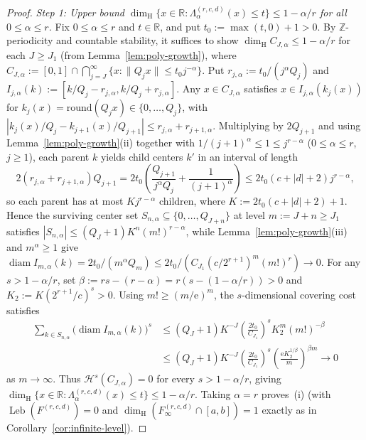 \documentclass[11pt]{article}
\theoremstyle{definition}
\theoremstyle{remark}
\newcommand{\R}{\mathbb{R}}
\newcommand{\Z}{\mathbb{Z}}
\newcommand{\ee}{\mathrm{e}}
\newcommand{\dimH}{\dim_{\mathrm{H}}}
\newcommand{\Lam}{\Lambda}
\begin{document}
\begin{proof}
\emph{Step 1: Upper bound $\dimH\{x\in\R:\Lam_\alpha^{(r,c,d)}(x)\le t\}\le1-\alpha/r$
for all $0\le\alpha\le r$.} Fix $0\le\alpha\le r$ and $t\in\R$, and put
$t_0:=\max(t,0)+1>0$. By $\Z$-periodicity and countable stability, it suffices to
show $\dimH C_{J,\alpha}\le1-\alpha/r$ for each $J\ge J_1$ (from
Lemma~\ref{lem:poly-growth}), where
$C_{J,\alpha}:=[0,1]\cap\bigcap_{j=J}^\infty\{x:\|Q_jx\|\le t_0j^{-\alpha}\}$.
Put $r_{j,\alpha}:=t_0/(j^\alpha Q_j)$ and
$I_{j,\alpha}(k):=[k/Q_j-r_{j,\alpha},k/Q_j+r_{j,\alpha}]$. Any $x\in C_{J,\alpha}$
satisfies $x\in I_{j,\alpha}(k_j(x))$ for $k_j(x)=\mathrm{round}(Q_jx)\in\{0,\dots,Q_j\}$,
with $|k_j(x)/Q_j-k_{j+1}(x)/Q_{j+1}|\le r_{j,\alpha}+r_{j+1,\alpha}$. Multiplying
by $2Q_{j+1}$ and using Lemma~\ref{lem:poly-growth}(ii) together with
$1/(j+1)^\alpha\le1\le j^{r-\alpha}$ ($0\le\alpha\le r$, $j\ge1$), each parent
$k$ yields child centers $k'$ in an interval of length
\[
2(r_{j,\alpha}+r_{j+1,\alpha})Q_{j+1}
=2t_0\left(\frac{Q_{j+1}}{j^\alpha Q_j}+\frac{1}{(j+1)^\alpha}\right)
\le 2t_0(c+|d|+2)j^{r-\alpha},
\]
so each parent has at most $Kj^{r-\alpha}$ children, where $K:=2t_0(c+|d|+2)+1$.
Hence the surviving center set $S_{n,\alpha}\subseteq\{0,\dots,Q_{J+n}\}$ at
level $m:=J+n\ge J_1$ satisfies
$|S_{n,\alpha}|\le(Q_J+1)K^n(m!)^{r-\alpha}$, while
Lemma~\ref{lem:poly-growth}(iii) and $m^\alpha\ge1$ give
$\operatorname{diam}I_{m,\alpha}(k)=2t_0/(m^\alpha Q_m)\le2t_0/(C_{J_1}(c/2^{r+1})^m(m!)^r)\to0$.
For any $s>1-\alpha/r$, set $\beta:=rs-(r-\alpha)=r(s-(1-\alpha/r))>0$ and
$K_2:=K(2^{r+1}/c)^s>0$. Using $m!\ge(m/\ee)^m$, the $s$-dimensional covering
cost satisfies
\begin{align*}
\sum_{k\in S_{n,\alpha}}\bigl(\operatorname{diam}I_{m,\alpha}(k)\bigr)^s
&\le(Q_J+1)K^{-J}\left(\frac{2t_0}{C_{J_1}}\right)^s K_2^m(m!)^{-\beta}\\
&\le(Q_J+1)K^{-J}\left(\frac{2t_0}{C_{J_1}}\right)^s
\left(\frac{\ee K_2^{1/\beta}}{m}\right)^{\beta m}\longrightarrow0
\end{align*}
as $m\to\infty$. Thus $\mathcal H^s(C_{J,\alpha})=0$ for every $s>1-\alpha/r$,
giving $\dimH\{x\in\R:\Lam_\alpha^{(r,c,d)}(x)\le t\}\le1-\alpha/r$. Taking
$\alpha=r$ proves~(i) (with $\operatorname{Leb}(F^{(r,c,d)})=0$ and
$\dimH(F_\infty^{(r,c,d)}\cap[a,b])=1$ exactly as in Corollary~\ref{cor:infinite-level}).


\end{proof}
\end{document}
